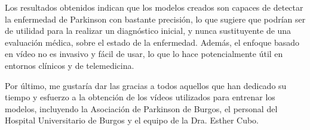 Los resultados obtenidos indican que los modelos creados son capaces de detectar
la enfermedad de Parkinson con bastante precisión, lo que sugiere que podrían
ser de utilidad para la realizar un diagnóstico inicial, y nunca sustituyente de
una evaluación médica, sobre el estado de la enfermedad. Además, el enfoque
basado en vídeo no es invasivo y fácil de usar, lo que lo hace potencialmente
útil en entornos clínicos y de telemedicina.

Por último, me gustaría dar las gracias a todos aquellos que han dedicado su
tiempo y esfuerzo a la obtención de los vídeos utilizados para entrenar los
modelos, incluyendo la Asociación de Parkinson de Burgos, el personal del
Hospital Universitario de Burgos y el equipo de la Dra. Esther Cubo.
